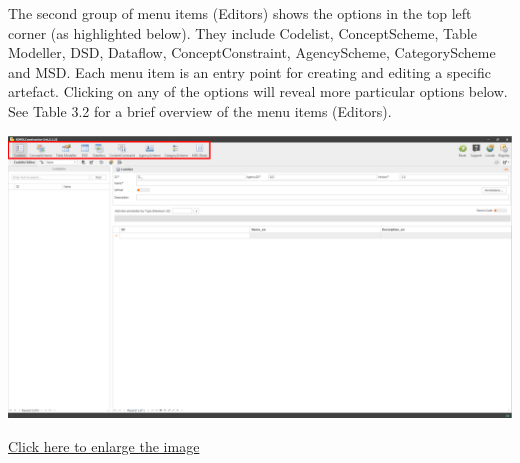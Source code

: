 \documentclass[
]{book}
\theoremstyle{definition}
\theoremstyle{definition}
\theoremstyle{definition}
\theoremstyle{definition}
\theoremstyle{remark}
\begin{document}
The second group of menu items (Editors) shows the options in the top left corner (as highlighted below). They include Codelist, ConceptScheme, Table Modeller, DSD, Dataflow, ConceptConstraint, AgencyScheme, CategoryScheme and MSD. Each menu item is an entry point for creating and editing a specific artefact. Clicking on any of the options will reveal more particular options below. See Table 3.2 for a brief overview of the menu items (Editors).

\begin{center}\includegraphics[width=1\linewidth]{./images/image013} \end{center}

\href{images/image013.png}{Click here to enlarge the image}
\end{document}
